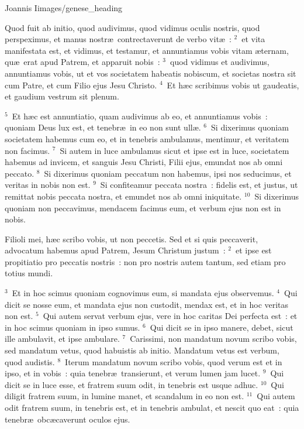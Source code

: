{Joannis I}{images/genese_heading}


\lettrine[lines=10,image=true,loversize=0.05,lraise=-0.03]{Q}{}uod fuit ab initio, quod audivimus, quod vidimus oculis nostris, quod perspeximus, et manus nostr\ae\ contrectaverunt de verbo vit\ae~:
${}^{2}$~et vita manifestata est, et vidimus, et testamur, et annuntiamus vobis vitam \ae ternam, qu\ae\ erat apud Patrem, et apparuit nobis~:
${}^{3}$~quod vidimus et audivimus, annuntiamus vobis, ut et vos societatem habeatis nobiscum, et societas nostra sit cum Patre, et cum Filio ejus Jesu Christo.
${}^{4}$~Et h\ae c scribimus vobis ut gaudeatis, et gaudium vestrum sit plenum.


${}^{5}$~Et h\ae c est annuntiatio, quam audivimus ab eo, et annuntiamus vobis~: quoniam Deus lux est, et tenebr\ae\ in eo non sunt ull\ae .
${}^{6}$~Si dixerimus quoniam societatem habemus cum eo, et in tenebris ambulamus, mentimur, et veritatem non facimus.
${}^{7}$~Si autem in luce ambulamus sicut et ipse est in luce, societatem habemus ad invicem, et sanguis Jesu Christi, Filii ejus, emundat nos ab omni peccato.
${}^{8}$~Si dixerimus quoniam peccatum non habemus, ipsi nos seducimus, et veritas in nobis non est.
${}^{9}$~Si confiteamur peccata nostra~: fidelis est, et justus, ut remittat nobis peccata nostra, et emundet nos ab omni iniquitate.
${}^{10}$~Si dixerimus quoniam non peccavimus, mendacem facimus eum, et verbum ejus non est in nobis.

\lettrine[lines=3,image=true,loversize=0.05,lraise=-0.03]{F}{}ilioli mei, h\ae c scribo vobis, ut non peccetis. Sed et si quis peccaverit, advocatum habemus apud Patrem, Jesum Christum justum~:
${}^{2}$~et ipse est propitiatio pro peccatis nostris~: non pro nostris autem tantum, sed etiam pro totius mundi.


${}^{3}$~Et in hoc scimus quoniam cognovimus eum, si mandata ejus observemus.
${}^{4}$~Qui dicit se nosse eum, et mandata ejus non custodit, mendax est, et in hoc veritas non est.
${}^{5}$~Qui autem servat verbum ejus, vere in hoc caritas Dei perfecta est~: et in hoc scimus quoniam in ipso sumus.
${}^{6}$~Qui dicit se in ipso manere, debet, sicut ille ambulavit, et ipse ambulare.
${}^{7}$~Carissimi, non mandatum novum scribo vobis, sed mandatum vetus, quod habuistis ab initio. Mandatum vetus est verbum, quod audistis.
${}^{8}$~Iterum mandatum novum scribo vobis, quod verum est et in ipso, et in vobis~: quia tenebr\ae\ transierunt, et verum lumen jam lucet.
${}^{9}$~Qui dicit se in luce esse, et fratrem suum odit, in tenebris est usque adhuc.
${}^{10}$~Qui diligit fratrem suum, in lumine manet, et scandalum in eo non est.
${}^{11}$~Qui autem odit fratrem suum, in tenebris est, et in tenebris ambulat, et nescit quo eat~: quia tenebr\ae\ obc\ae caverunt oculos ejus.


